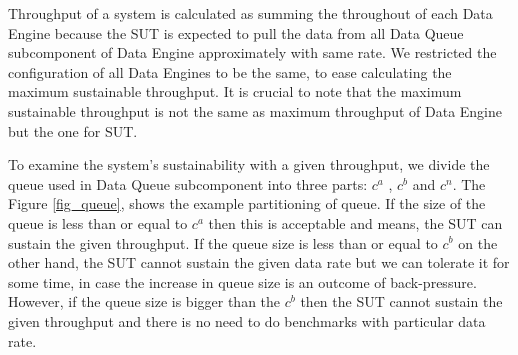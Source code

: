 \documentclass{vldb}
\begin{document}
Throughput of a system is calculated as summing the throughout of each Data Engine  because the SUT is expected to pull the data from all Data Queue subcomponent of Data Engine approximately with same rate. We restricted the configuration of all Data Engines to be the same, to ease calculating the maximum sustainable throughput. It is crucial to note that the maximum sustainable throughput is not the same as maximum throughput of Data Engine but the one for SUT. 

To examine the system's sustainability with a given throughput, we divide the queue used in Data Queue subcomponent into three parts: $c^{a}$ , $c^{b}$ and $c^{n}$. The Figure \ref{fig_queue}, shows the example partitioning of queue. If the size of the queue is less than or equal to $c^{a}$ then this is acceptable and means, the SUT can sustain the given throughput. If the queue size is less than or equal to $c^{b}$ on the other hand, the SUT cannot sustain the given data rate but we can tolerate it for some time, in case the increase in queue size is an outcome of back-pressure. However, if the queue size is bigger than the $c^{b}$ then the SUT cannot sustain the given throughput and there is no need to do benchmarks with particular data rate.
\end{document}

